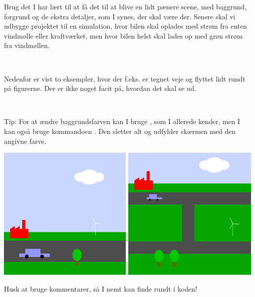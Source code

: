 \documentclass{ucph-handout}
\begin{document}
\begin{exercisebox}[adjusted title=Green City]
Brug det I har lært til at få det til at blive en lidt pænere scene,
med baggrund, forgrund og de ekstra detaljer, som I synes, der skal være
der. Senere skal vi udbygge projektet til en simulation, hvor bilen
skal oplades med strøm fra enten vindmølle eller kraftværket, men hvor
bilen helst skal lades op med grøn strøm fra vindmøllen.

~

Nedenfor er vist to eksempler, hvor der f.eks. er tegnet veje og
flyttet lidt rundt på figurerne. Der er ikke noget facit på, hvordan
det skal se ud.

~

Tip: For at ændre baggrundsfarven  kan I bruge , som I
allerede kender, men I kan også bruge kommandoen .
Den sletter alt og udfylder skærmen med den angivne farve.

\begin{center}
  \includegraphics[width=0.49\textwidth]{../illustrations/images/elbil.png}
  \includegraphics[width=0.495\textwidth]{../illustrations/images/miniby.png}
\end{center}

\noindent
Husk at bruge kommentarer, så I nemt kan finde rundt i koden!
\end{exercisebox}
\end{document}
